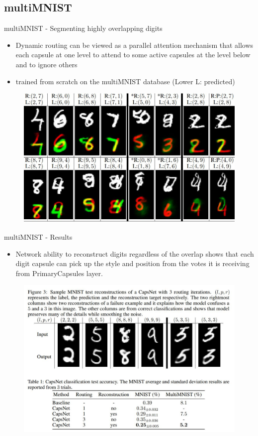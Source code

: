 \documentclass{beamer}
\begin{document}
\subsection{multiMNIST}
\begin{frame}{multiMNIST - Segmenting highly overlapping digits}
\begin{itemize}
    \item Dynamic routing can be viewed as a parallel attention mechanism that allows each capsule at one level to attend to some active capsules at the level below and to ignore others
    \item trained from scratch on the multiMNIST database (Lower L: predicted)
\end{itemize}
\begin{figure}
    \centering
    \includegraphics[scale = 0.6]{multiMNIST.JPG}
\end{figure}
\end{frame}

\begin{frame}{multiMNIST - Results}
    \begin{itemize}
        \item Network ability to reconstruct digits regardless of the overlap shows that each digit capsule can pick up the style and position from the votes it is receiving from PrimaryCapsules layer.
    \end{itemize}
    \begin{figure}
        \centering
        \includegraphics[scale=0.5]{mnist_results.JPG}
    \end{figure}
\end{frame}
\end{document}
